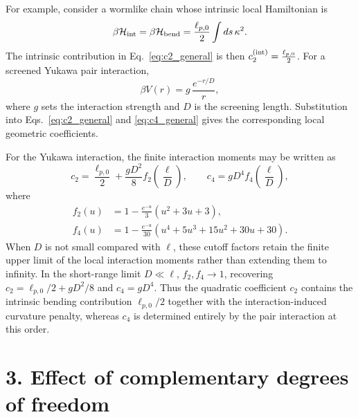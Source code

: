\documentclass[11pt]{article}
\begin{document}
For example, consider a wormlike chain whose intrinsic local Hamiltonian is
\begin{equation}
\beta\mathcal H_{\rm int}
=
\beta\mathcal H_{\rm bend}
=
\frac{\ell_{p,0}}{2}
\int ds\,\kappa^2.
\end{equation}
The intrinsic contribution in Eq.~\eqref{eq:c2_general} is then
\(c_2^{(\rm int)}
=
\frac{\ell_{p,0}}{2}\).
For a screened Yukawa pair interaction,
\begin{equation}
\beta V(r)
=
g\,\frac{e^{-r/D}}{r},
\end{equation}
where \(g\) sets the interaction strength and \(D\) is the screening length. Substitution into Eqs.~\eqref{eq:c2_general} and \eqref{eq:c4_general} gives the corresponding local geometric coefficients.

For the Yukawa interaction, the finite interaction moments may be written as
\begin{equation}
c_2
=
\frac{\ell_{p,0}}{2}
+
\frac{gD^2}{8}
f_2\!\left(\frac{\ell}{D}\right),
\qquad
c_4
=
gD^4
f_4\!\left(\frac{\ell}{D}\right),
\label{eq:yukawa_finite_coefficients}
\end{equation}
where
\begin{align}
f_2(u)
&=
1-
\frac{e^{-u}}{3}
\left(u^2+3u+3\right),
\\
f_4(u)
&=
1-
\frac{e^{-u}}{30}
\left(u^4+5u^3+15u^2+30u+30\right).
\end{align}
When \(D\) is not small compared with \(\ell\), these cutoff factors retain the finite upper limit of the local interaction moments rather than extending them to infinity. In the short-range limit \(D\ll\ell\), \(f_2,f_4\rightarrow1\), recovering \(c_2=\ell_{p,0}/2+gD^2/8\) and \(c_4=gD^4\). Thus the quadratic coefficient \(c_2\) contains the intrinsic bending contribution \(\ell_{p,0}/2\) together with the interaction-induced curvature penalty, whereas \(c_4\) is determined entirely by the pair interaction at this order.


\section*{3. Effect of complementary degrees of freedom}
\end{document}
